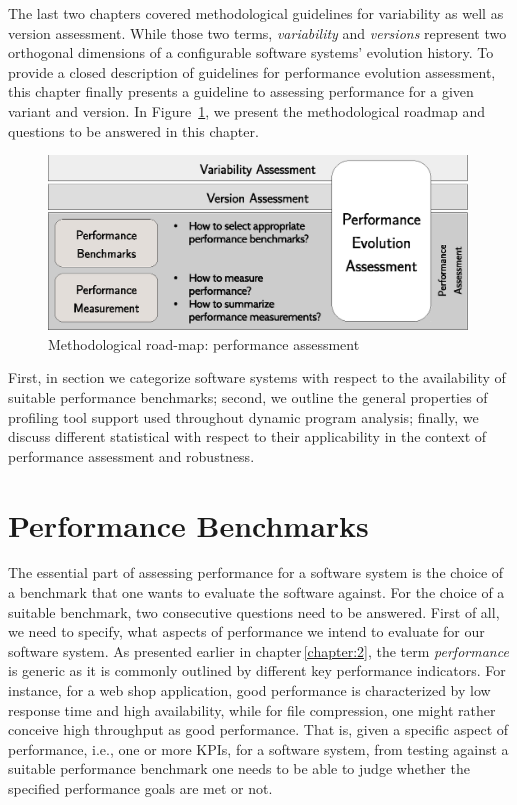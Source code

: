 The last two chapters covered methodological guidelines for variability as well
as version assessment. While those two terms, \emph{variability} and
\emph{versions} represent two orthogonal dimensions of a configurable software
systems’ evolution history. To provide a closed description of guidelines for performance
evolution assessment, this chapter finally presents a guideline to assessing
performance for a given variant and version. In Figure~\ref{fig:roadmap_3}, we
present the methodological roadmap and questions to be answered in this chapter.

\begin{figure}[h!]
	\centering
	\includegraphics[width=0.99\textwidth]{images/process_perfassessment.eps}
	\caption{Methodological road-map: performance assessment}
	\label{fig:roadmap_3}
\end{figure}

First, in section we categorize software systems with respect to the availability of suitable performance
benchmarks; second, we outline the general properties of profiling tool support
used throughout dynamic program analysis; finally, we discuss different statistical
with respect to their applicability in the context of performance assessment
and robustness.

\section{Performance Benchmarks}
The essential part of assessing performance for a software system is the choice
of a benchmark that one wants to evaluate the software against. For the choice
of a suitable benchmark, two consecutive questions need to be answered. First of
all, we need to specify, what aspects of performance we intend to evaluate for
our software system. As presented earlier in chapter\,\ref{chapter:2}, the term
\emph{performance} is generic as it is commonly outlined by different key
performance indicators. For instance, for a web shop application, good performance is characterized by low response
time and high availability, while for file compression, one might rather
conceive high throughput as good performance. That is, given a specific
aspect of performance, i.e., one or more KPIs, for a software system, from
testing against a suitable performance benchmark one needs to be able to judge
whether the specified performance goals are met or not.

